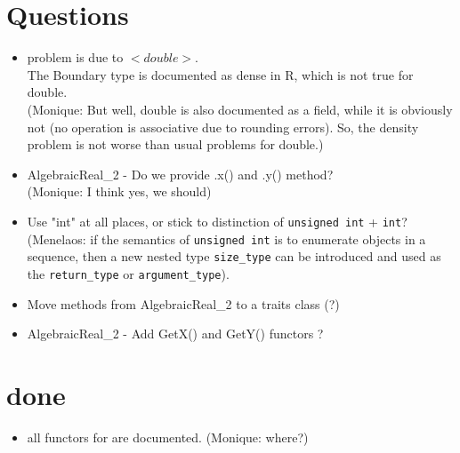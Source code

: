 \section{Questions}
\begin{itemize}
\item problem is due to $<double>$.\\
    The Boundary type is documented as dense in R, which is not true
    for double.\\ (Monique: But well, double is also documented as a
    field, while it is obviously not (no operation is associative
    due to rounding errors). So, the density problem is not worse
    than usual problems for double.)
\item AlgebraicReal\_2 - Do we provide .x() and .y() method?\\
     (Monique: I think yes, we should)
\item Use "int" at all places, or stick to distinction of \texttt{unsigned
   int} + \texttt{int}?
   (Menelaos: if the semantics of \texttt{unsigned int} is to enumerate
   objects in a sequence, then a new nested type \texttt{size\_type}
   can be introduced and used as the \texttt{return\_type} or
   \texttt{argument\_type}).
\end{itemize}

\begin{itemize}
\item Move methods from AlgebraicReal\_2 to a traits class (?)
\item AlgebraicReal\_2 - Add GetX() and GetY() functors ?
\end{itemize}

\section{done} 
\begin{itemize}
\item all functors for  
      are documented. (Monique: where?)
\end{itemize}


